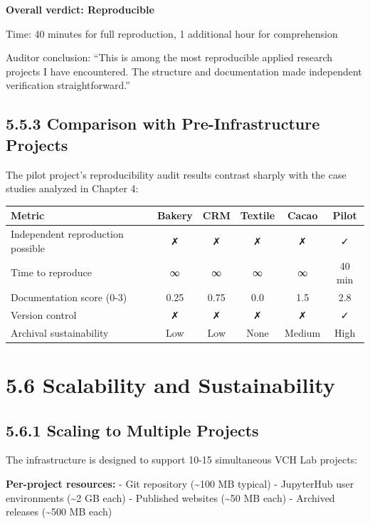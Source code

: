 \documentclass[
  oneside,
  open=any]{scrbook}
\begin{document}
\textbf{Overall verdict: Reproducible}

Time: 40 minutes for full reproduction, 1 additional hour for
comprehension

Auditor conclusion: ``This is among the most reproducible applied
research projects I have encountered. The structure and documentation
made independent verification straightforward.''

\subsection{5.5.3 Comparison with Pre-Infrastructure
Projects}\label{comparison-with-pre-infrastructure-projects}

The pilot project's reproducibility audit results contrast sharply with
the case studies analyzed in Chapter 4:

\begin{longtable}[]{@{}lccccc@{}}
\toprule\noalign{}
Metric & Bakery & CRM & Textile & Cacao & Pilot \\
\midrule\noalign{}
\endhead
\bottomrule\noalign{}
\endlastfoot
Independent reproduction possible & ✗ & ✗ & ✗ & ✗ & ✓ \\
Time to reproduce & ∞ & ∞ & ∞ & ∞ & 40 min \\
Documentation score (0-3) & 0.25 & 0.75 & 0.0 & 1.5 & 2.8 \\
Version control & ✗ & ✗ & ✗ & ✗ & ✓ \\
Archival sustainability & Low & Low & None & Medium & High \\
\end{longtable}

\section{5.6 Scalability and
Sustainability}\label{scalability-and-sustainability}

\subsection{5.6.1 Scaling to Multiple
Projects}\label{scaling-to-multiple-projects}

The infrastructure is designed to support 10-15 simultaneous VCH Lab
projects:

\textbf{Per-project resources:} - Git repository (\textasciitilde100 MB
typical) - JupyterHub user environments (\textasciitilde2 GB each) -
Published websites (\textasciitilde50 MB each) - Archived releases
(\textasciitilde500 MB each)
\end{document}

